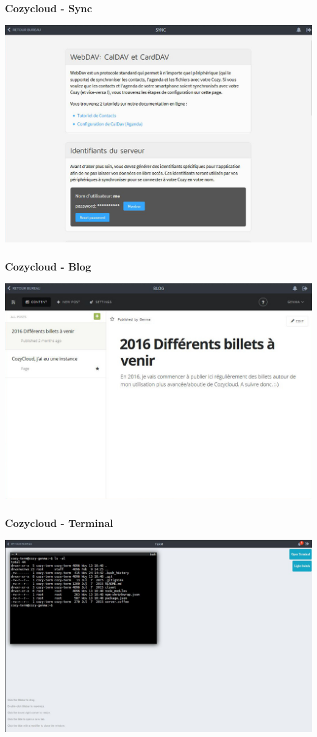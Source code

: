 \documentclass{beamer}
\begin{document}
\begin{frame}
\frametitle{Cozycloud - Sync}
\includegraphics[scale=0.3] {./CozyCloud/CozyCloud_Sync.jpg}
\end{frame}

\begin{frame}
\frametitle{Cozycloud - Blog}
\includegraphics[scale=0.3] {./CozyCloud/CozyCloud_Blog.jpg}
\end{frame}

\begin{frame}
\frametitle{Cozycloud - Terminal}
\includegraphics[scale=0.4] {./Cozycloud/Cozycloud_Term.jpg}
\end{frame}
\end{document}
